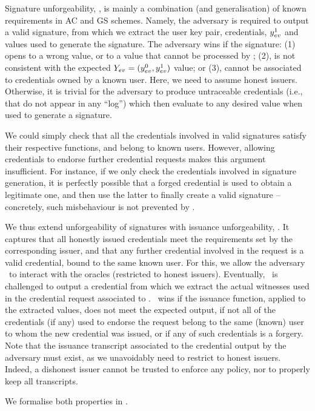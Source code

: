 Signature unforgeability, \ExpForgeSign, is mainly a combination (and
generalisation) of known requirements in AC and GS schemes. Namely, the
adversary is required to output a valid signature, from which we extract the
user key pair, credentials, $y_{ev}^1$ and \yinsp values used to generate the
signature. The adversary wins if the signature: (1) opens to a wrong value, or
to a value that cannot be processed by \Judge; (2), is not consistent with the
expected $Y_{ev} = (y_{ev}^0,y_{ev}^1)$ value; or (3), cannot be associated to
credentials owned by a known user. Here, we need to assume honest issuers.
Otherwise, it is trivial for the adversary to produce untraceable credentials
(i.e., that do not appear in any ``log'') which then evaluate to any desired
value when used to generate a signature.

We could simply check that all the credentials involved in valid signatures
satisfy their respective \fissue functions, and belong to known users. However,
allowing credentials to endorse further credential requests makes this argument
insufficient. For instance, if we only check the credentials involved in
signature generation, it is perfectly possible that a forged credential is used
to obtain a legitimate one, and then use the latter to finally create a valid
signature -- concretely, such misbehaviour is not prevented by \ExpForgeSign. 

We thus extend unforgeability of signatures with issuance unforgeability,
\ExpForgeIssue. It captures that all honestly issued credentials meet the
requirements set by the corresponding issuer, and that any further credential
involved in the request is a valid credential, bound to the same known user. For
this, we allow the adversary \adv~to interact with the oracles (restricted to
honest issuers). Eventually, \adv~is challenged to output a credential \Cred
from which we extract the actual witnesses used in the credential request
associated to \cid. \adv~wins if the issuance function, applied to the extracted
values, does not meet the expected output, if not all of the credentials (if
any) used to endorse the request belong to the same (known) user to whom the new
credential was issued, or if any of such credentials is a forgery. Note that the
issuance transcript associated to the credential output by the adversary must
exist, as we unavoidably need to restrict to honest issuers. Indeed, a dishonest
issuer cannot be trusted to enforce any policy, nor to properly keep all
transcripts.

We formalise both properties in .

